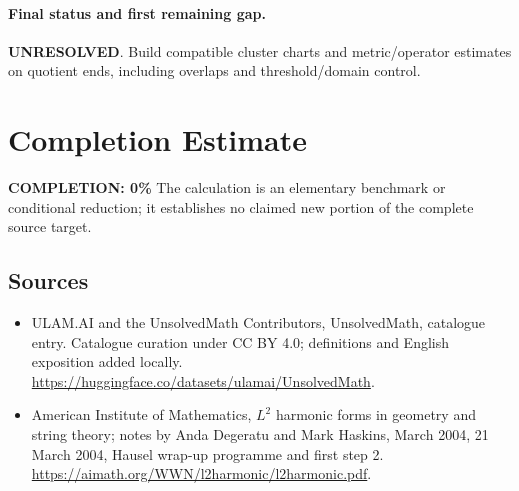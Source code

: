 \documentclass[11pt]{article}
\begin{document}
\paragraph{Final status and first remaining gap.}
\textbf{UNRESOLVED}. Build compatible cluster charts and metric/operator estimates on quotient ends, including overlaps and threshold/domain control.

\section{Completion Estimate}
\noindent\textbf{COMPLETION: 0\%}
The calculation is an elementary benchmark or conditional reduction; it establishes no claimed new portion of the complete source target.

\subsection{Sources}
\begin{itemize}
\item[\hypertarget{source:statement:1}{S1}] ULAM.AI and the UnsolvedMath Contributors, UnsolvedMath, catalogue entry. Catalogue curation under CC BY 4.0; definitions and English exposition added locally.
\url{https://huggingface.co/datasets/ulamai/UnsolvedMath}.
\item[\hypertarget{source:statement:2}{S2}] American Institute of Mathematics, $L^2$ harmonic forms in geometry and string theory; notes by Anda Degeratu and Mark Haskins, March 2004, 21 March 2004, Hausel wrap-up programme and first step 2.
\url{https://aimath.org/WWN/l2harmonic/l2harmonic.pdf}.
\end{itemize}
\label{end:statement}
\end{document}

